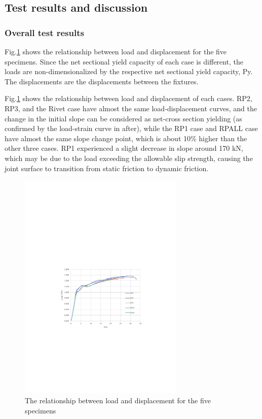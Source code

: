 \subsection{Test results and discussion}

\subsubsection{Overall test results}

Fig.\ref{fig-3-10} shows the relationship between load and displacement for the five specimens. Since the net sectional yield capacity of each case is different, the loads are non-dimensionalized by the respective net sectional yield capacity, Py. The displacements are the displacements between the fixtures.

Fig.\ref{fig-3-10} shows the relationship between load and displacement of each cases. RP2, RP3, and the Rivet case have almost the same load-displacement curves, and the change in the initial slope can be considered as net-cross section yielding (as confirmed by the load-strain curve in after), while the RP1 case and RPALL case have almost the same slope change point, which is about 10\% higher than the other three cases. RP1 experienced a slight decrease in slope around 170 kN, which may be due to the load exceeding the allowable slip strength, causing the joint surface to transition from static friction to dynamic friction.

\begin{figure}[htbp]
    \centering
    \includegraphics[width=0.7\textwidth]{imgs/ch3/fig3-10.pdf}
    \caption{The relationship between load and displacement for the five specimens}
    \label{fig-3-10}
\end{figure}

